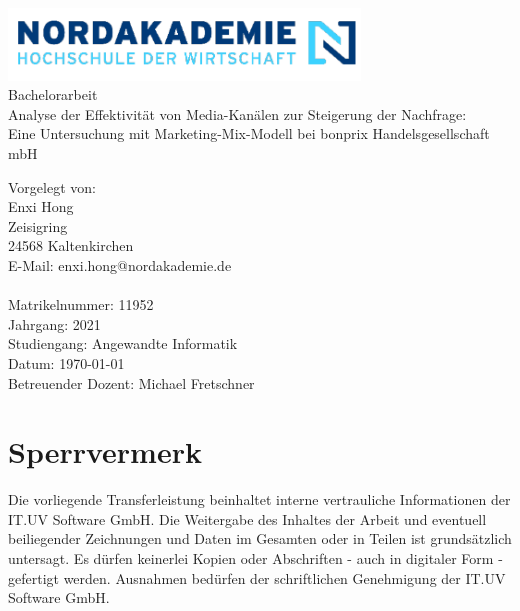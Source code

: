 \documentclass{common/nak}
\begin{document}
\hspace{3cm}
\begin{center}
    \includegraphics[width=0.7\textwidth]{images/nak_logo2.png}\\
     \huge { Bachelorarbeit \\[1em]
     \large{Analyse der Effektivität von Media-Kanälen zur Steigerung der Nachfrage:
     \\ Eine Untersuchung mit Marketing-Mix-Modell bei bonprix Handelsgesellschaft mbH
}}
\end{center}

\vspace*{\fill}


\noindent Vorgelegt von:\\
Enxi Hong \\
Zeisigring \\
24568 Kaltenkirchen\\
E-Mail: enxi.hong@nordakademie.de\\
\\
Matrikelnummer: 11952\\
Jahrgang: 2021\\
Studiengang: Angewandte Informatik\\
Datum: \today\\
Betreuender Dozent: Michael Fretschner\\

\newpage

\newpage
\section*{Sperrvermerk}

Die vorliegende Transferleistung beinhaltet interne vertrauliche Informationen der IT.UV Software GmbH. Die Weitergabe des Inhaltes der Arbeit und eventuell beiliegender Zeichnungen und Daten im Gesamten oder in Teilen ist grundsätzlich untersagt. Es dürfen keinerlei Kopien oder Abschriften - auch in digitaler Form - gefertigt werden. Ausnahmen bedürfen der schriftlichen Genehmigung der IT.UV Software GmbH.
\end{document}
